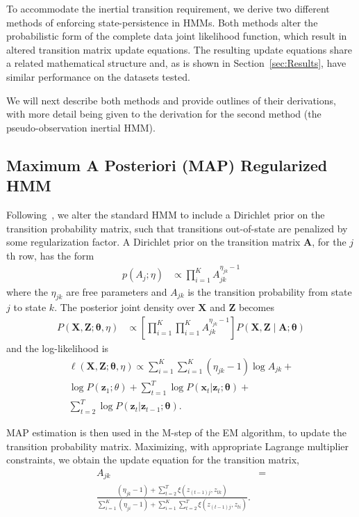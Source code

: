 \documentclass[letterpaper]{article}
\begin{document}
To accommodate the inertial transition requirement, we derive two different methods of enforcing state-persistence in HMMs. Both methods alter the probabilistic form of the complete data joint likelihood function, which result in altered transition matrix update equations. The resulting update equations share a related mathematical structure and, as is shown in Section~\ref{sec:Results}, have similar performance on the datasets tested. 

We will next describe both methods and provide outlines of their derivations, with more detail being given to the derivation for the second method (the pseudo-observation inertial HMM).

\subsection{Maximum A Posteriori (MAP) Regularized HMM}

Following~\cite{MAP1994}, we alter the standard HMM to include a Dirichlet prior on the transition probability matrix, such that transitions out-of-state are penalized by some regularization factor. A Dirichlet prior on the transition matrix $\mathbf{A}$, for the $j$th row, has the form
\begin{align*}
    p(A_j; \eta) &\propto \prod_{i=1}^{K} A_{jk}^{\eta_{jk}-1}
\end{align*}
where the $\eta_{jk}$ are free parameters and $A_{jk}$ is the transition probability from state $j$ to state $k$. The posterior joint density over $\mathbf{X}$ and $\mathbf{Z}$ becomes
\begin{align*}
    P(\mathbf{X}, \mathbf{Z} ; \mathbf{\theta}, \eta) 
    &\propto \left[\prod_{i=1}^{K}\prod_{i=1}^{K} A_{jk}^{\eta_{jk} - 1}\right] P(\mathbf{X}, \mathbf{Z} \mid \mathbf{A}; \mathbf{\theta}) 
\end{align*}
and the log-likelihood is
\begin{align*}
\ell(\mathbf{X}, \mathbf{Z} ; \mathbf{\theta}, \eta) \propto \sum_{i=1}^{K}\sum_{i=1}^{K} (\eta_{jk} - 1)\log A_{jk} + \\
\log P(\mathbf{z}_{1}; \theta) + \sum_{t=1}^{T}\log P(\mathbf{x}_t|\mathbf{z}_t; \mathbf{\theta}) + \\\sum_{t=2}^{T}\log P(\mathbf{z}_t|\mathbf{z}_{t-1}; \mathbf{\theta}).
\end{align*}

MAP estimation is then used in the M-step of the EM algorithm, to update the transition probability matrix. Maximizing, with appropriate Lagrange multiplier constraints, we obtain the update equation for the transition matrix, 
\begin{align}
    A_{jk}                &\nonumber
     =\\ \frac{(\eta_{jk} - 1) + \sum_{t=2}^{T} \xi(z_{(t-1)j}, z_{tk})}   
    {\sum_{i=1}^{K}(\eta_{ji} - 1) + \sum_{i=1}^{K}\sum_{t=2}^{T} \xi(z_{(t-1)j}, z_{ti})}.
\end{align}
\end{document}
